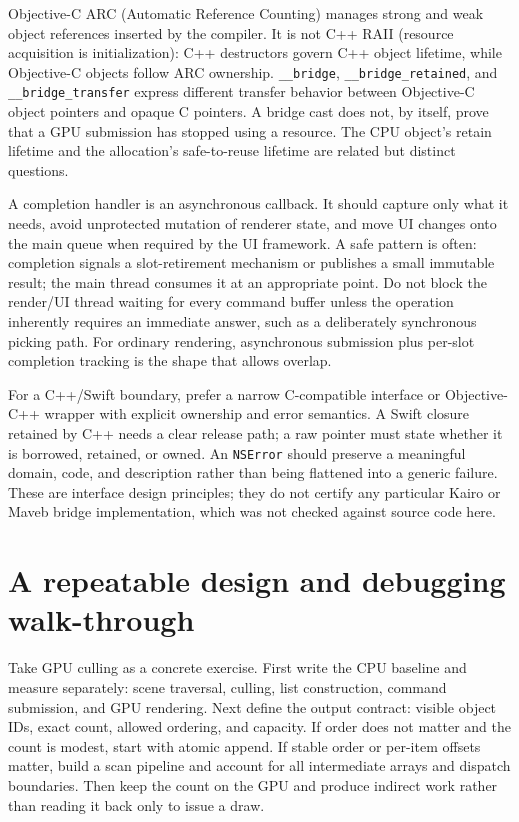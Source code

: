 Objective-C ARC (Automatic Reference Counting) manages strong and weak object references inserted by the compiler. It is not C++ RAII (resource acquisition is initialization): C++ destructors govern C++ object lifetime, while Objective-C objects follow ARC ownership. \texttt{\_\_bridge}, \texttt{\_\_bridge\_retained}, and \texttt{\_\_bridge\_transfer} express different transfer behavior between Objective-C object pointers and opaque C pointers. A bridge cast does not, by itself, prove that a GPU submission has stopped using a resource. The CPU object's retain lifetime and the allocation's safe-to-reuse lifetime are related but distinct questions.

A completion handler is an asynchronous callback. It should capture only what it needs, avoid unprotected mutation of renderer state, and move UI changes onto the main queue when required by the UI framework. A safe pattern is often: completion signals a slot-retirement mechanism or publishes a small immutable result; the main thread consumes it at an appropriate point. Do not block the render/UI thread waiting for every command buffer unless the operation inherently requires an immediate answer, such as a deliberately synchronous picking path. For ordinary rendering, asynchronous submission plus per-slot completion tracking is the shape that allows overlap.

For a C++/Swift boundary, prefer a narrow C-compatible interface or Objective-C++ wrapper with explicit ownership and error semantics. A Swift closure retained by C++ needs a clear release path; a raw pointer must state whether it is borrowed, retained, or owned. An \texttt{NSError} should preserve a meaningful domain, code, and description rather than being flattened into a generic failure. These are interface design principles; they do not certify any particular Kairo or Maveb bridge implementation, which was not checked against source code here.

\section{A repeatable design and debugging walk-through}\label{01-foundations-i-ch011-a-repeatable-design-and-debugging-walk-through}

\hypertarget{01-foundations-i-ch011-a-repeatable-design-and-debugging-walk-through}{}

Take GPU culling as a concrete exercise. First write the CPU baseline and measure separately: scene traversal, culling, list construction, command submission, and GPU rendering. Next define the output contract: visible object IDs, exact count, allowed ordering, and capacity. If order does not matter and the count is modest, start with atomic append. If stable order or per-item offsets matter, build a scan pipeline and account for all intermediate arrays and dispatch boundaries. Then keep the count on the GPU and produce indirect work rather than reading it back only to issue a draw.

